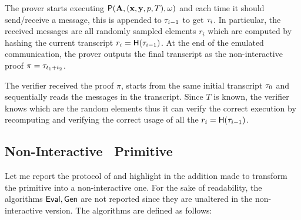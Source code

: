 The prover starts executing $\prove(\vA,(\vx,\vy,\pprime,T), \witness)$ and each time
it should send/receive a message, this is appended to $\transcript[i-1]$ to get $\transcript[i]$.
In particular, the received messages are all randomly sampled elements $r_i$ which are computed
by hashing the current transcript $r_i = \hashf{\transcript[i-1]}$.
At the end of the emulated communication, the prover outputs the final transcript as the non-interactive
proof $\proof = \transcript[t_1+t_2]$.

The verifier received the proof $\pi$, starts from the same initial transcript $\transcript[0]$
and sequentially reads the messages in the transcript.
Since $T$ is known, the verifier knows which are the random elements thus it can verify the correct
execution by recomputing and verifying the correct usage of all the $r_i = \hashf{\transcript[i-1]}$.

\vspace{2mm}




\subsection{Non-Interactive \PoSW\ Primitive}

Let me report the protocol of  and highlight in  the addition
made to transform the primitive into a non-interactive one.
%
For the sake of readability, the algorithms $\textsf{Eval},\textsf{Gen}$ are not reported since they
are unaltered in the non-interactive version.
%
The algorithms are defined as follows:

